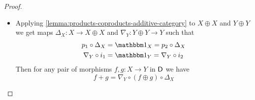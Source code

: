 \documentclass[../../main]{subfiles}
\begin{document}
\begin{proof}
\begin{itemize}
          Let \(X, Y \in \category{C}\) be two objects and \(X \oplus Y\) be its \hyperref[def:direct-sum]{direct sum}.
          Applying \(F\) to the diagram in \autoref{lemma:products-coproducts-additive-category} defining \(Z \cong X \oplus Y\) we get
          \begin{center}
          \end{center}
          Note that
          \begin{align*}
            Fp_{1} \circ Fi_{1} &= F(p_{1} \circ i_{1}) = F(\id_{X}) = \id_{F(X)} & Fp_{1} \circ Fi_{2} &= F(p_{1} \circ i_{2}) = F(0) = 0 \\
            Fp_{2} \circ Fi_{2} &= F(p_{2} \circ i_{2}) = F(\id_{Y}) = \id_{F(Y)} & Fp_{2} \circ Fi_{1} &= F(p_{2} \circ i_{1}) = F(0) = 0
          \end{align*}
          Furthermore since \(F\) is \hyperref[def:additive-functor]{additive}
          \begin{equation*}
            Fp \circ Fi + Fj \circ Fq = F(p \circ i + j \circ q) = F\id_{X \oplus Y} = \id_{F(X \oplus Y)}
          \end{equation*}
          Therefore by \autoref{lemma:products-coproducts-additive-category} \(F(X \oplus Y) \cong F(X) \oplus F(Y)\).
    \item[\(\impliedby\)] Applying \autoref{lemma:products-coproducts-additive-category} to \(X \oplus X\) and \(Y \oplus Y\) we get maps \(\Delta_{X}: X \to X \oplus X\) and \(\nabla_{Y}: Y \oplus Y \to Y\) such that
          \begin{align*}
            p_{1} \circ \Delta_{X} &= \id_{X} = p_{2} \circ \Delta_{X} \\
            \nabla_{Y} \circ i_{1} &= \id_{Y} = \nabla_{Y} \circ i_{2}
          \end{align*}
          Then for any pair of morphisms \(f, g: X \to Y\) in \(\mathsf{D}\) we have
          \begin{equation*}
            f + g = \nabla_{Y} \circ (f \oplus g) \circ \Delta_{X}
          \end{equation*}

\end{itemize}
\end{proof}
\end{document}
